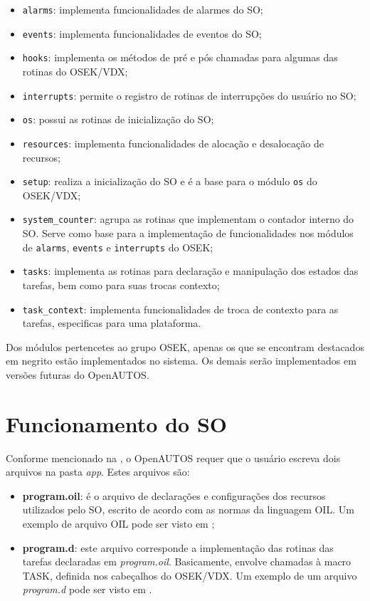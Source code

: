 \begin{itemize}
	\item \texttt{alarms}: implementa funcionalidades de alarmes do SO;
	\item \texttt{events}: implementa funcionalidades de eventos do SO;
	\item \texttt{hooks}: implementa os métodos de pré e pós chamadas para algumas das rotinas do OSEK/VDX;
	\item \texttt{interrupts}: permite o registro de rotinas de interrupções do usuário no SO;
	\item \texttt{os}: possui as rotinas de inicialização do SO;
	\item \texttt{resources}: implementa funcionalidades de alocação e desalocação de recursos;
	\item \texttt{setup}: realiza a inicialização do SO e é a base para o módulo \texttt{os} do OSEK/VDX;
	\item \texttt{system\_counter}: agrupa as rotinas que implementam o contador interno do SO. Serve como base para a implementação de funcionalidades nos módulos de \texttt{alarms}, \texttt{events} e \texttt{interrupts} do OSEK;
	\item \texttt{tasks}: implementa as rotinas para declaração e manipulação dos estados das tarefas, bem como para suas trocas contexto;
	\item \texttt{task\_context}: implementa funcionalidades de troca de contexto para as tarefas, especificas para uma plataforma.
\end{itemize}

Dos módulos pertencetes ao grupo OSEK, apenas os que se encontram destacados em negrito estão implementados no sistema. Os demais serão implementados em versões futuras do OpenAUTOS.

\section{Funcionamento do SO} \label{cap:cap4_utilizando_o_sistema}

Conforme mencionado na , o OpenAUTOS requer que o usuário escreva dois arquivos na pasta \emph{app}. Estes arquivos são:

\begin{itemize}
	\item \textbf{program.oil}: é o arquivo de declarações e configurações dos recursos utilizados pelo SO, escrito de acordo com as normas da linguagem OIL. Um exemplo de arquivo OIL pode ser visto em ;
	\item \textbf{program.d}: este arquivo corresponde a implementação das rotinas das tarefas declaradas em \emph{program.oil}. Basicamente, envolve chamadas à macro TASK, definida nos cabeçalhos do OSEK/VDX. Um exemplo de um arquivo \emph{program.d} pode ser visto em .
\end{itemize}


